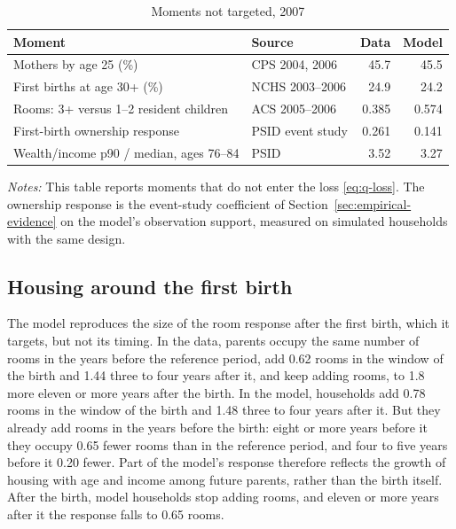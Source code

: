 \begin{table}[t]
\centering
\caption{Moments not targeted, 2007}
\label{tab:quant-untargeted}
\small
\begin{tabularx}{\textwidth}{@{}X l r r@{}}
\toprule
Moment & Source & Data & Model \\
\midrule
Mothers by age 25 (\%) & CPS 2004, 2006 & 45.7 & 45.5 \\
First births at age 30+ (\%) & NCHS 2003--2006 & 24.9 & 24.2 \\
Rooms: 3+ versus 1--2 resident children & ACS 2005--2006 & 0.385 & 0.574 \\
First-birth ownership response & PSID event study & 0.261 & 0.141 \\
Wealth/income p90 / median, ages 76--84 & PSID & 3.52 & 3.27 \\
\bottomrule
\end{tabularx}
\par\smallskip
\begin{minipage}{0.95\linewidth}
\footnotesize\textit{Notes:} This table reports moments that do not enter
the loss \eqref{eq:q-loss}. The ownership response is the event-study
coefficient of Section~\ref{sec:empirical-evidence} on the model's
observation support, measured on simulated households with the same design.
\end{minipage}
\end{table}

\subsection{Housing around the first birth}
The model reproduces the size of the room response after the first birth,
which it targets, but not its timing. In the data, parents occupy the same
number of rooms in the years before the reference period, add 0.62 rooms in
the window of the birth and 1.44 three to four years after it, and keep
adding rooms, to 1.8 more eleven or more years after the birth. In the
model, households add 0.78 rooms in the window of the birth and 1.48 three to
four years after it. But they already add rooms in the years before the
birth: eight or more years before it they occupy 0.65 fewer rooms than in
the reference period, and four to five years before it 0.20 fewer. Part of
the model's response therefore reflects the growth of housing with age and
income among future parents, rather than the birth itself. After the birth,
model households stop adding rooms, and eleven or more years after it the
response falls to 0.65 rooms.

